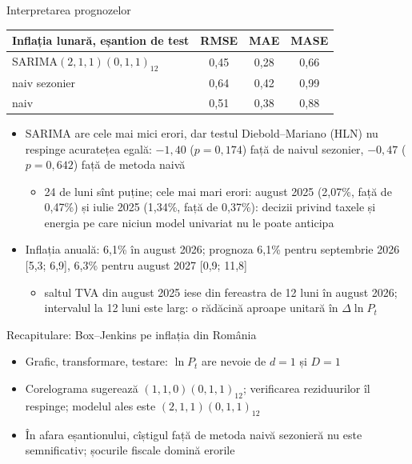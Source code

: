\begin{frame}{Interpretarea prognozelor}
\itemsize{\footnotesize}
\begin{center}
\footnotesize
\begin{tabular}{lccc}
\toprule
\textbf{Inflația lunară, eșantion de test} & RMSE & MAE & MASE \\
\midrule
SARIMA$(2,1,1)(0,1,1)_{12}$ & 0{,}45 & 0{,}28 & 0{,}66 \\
naiv sezonier & 0{,}64 & 0{,}42 & 0{,}99 \\
naiv & 0{,}51 & 0{,}38 & 0{,}88 \\
\bottomrule
\end{tabular}
\end{center}
\begin{itemize}
    \item SARIMA are cele mai mici erori, dar testul Diebold--Mariano (HLN) nu respinge acuratețea egală: $\ensuremath{-}1{,}40$ ($p = 0{,}174$) față de naivul sezonier, $\ensuremath{-}0{,}47$ ($p = 0{,}642$) față de metoda naivă
    \begin{itemize}
        \item 24 de luni sînt puține; cele mai mari erori: august 2025 (2{,}07\%, față de 0{,}47\%) și iulie 2025 (1{,}34\%, față de 0{,}37\%): decizii privind taxele și energia pe care niciun model univariat nu le poate anticipa
    \end{itemize}
    \item Inflația anuală: 6{,}1\% în august 2026; prognoza 6{,}1\% pentru septembrie 2026 [5{,}3; 6{,}9], 6{,}3\% pentru august 2027 [0{,}9; 11{,}8]
    \begin{itemize}
        \item saltul TVA din august 2025 iese din fereastra de 12 luni în august 2026; intervalul la 12 luni este larg: o rădăcină aproape unitară în $\Delta\ln P_t$
    \end{itemize}
\end{itemize}
\end{frame}

\begin{frame}{Recapitulare: Box--Jenkins pe inflația din România}
\itemsize{\small}
\begin{itemize}
    \item Grafic, transformare, testare: $\ln P_t$ are nevoie de $d = 1$ și $D = 1$
    \item Corelograma sugerează $(1,1,0)(0,1,1)_{12}$; verificarea reziduurilor îl respinge; modelul ales este $(2,1,1)(0,1,1)_{12}$
    \item În afara eșantionului, cîștigul față de metoda naivă sezonieră nu este semnificativ; șocurile fiscale domină erorile
\end{itemize}
\end{frame}


